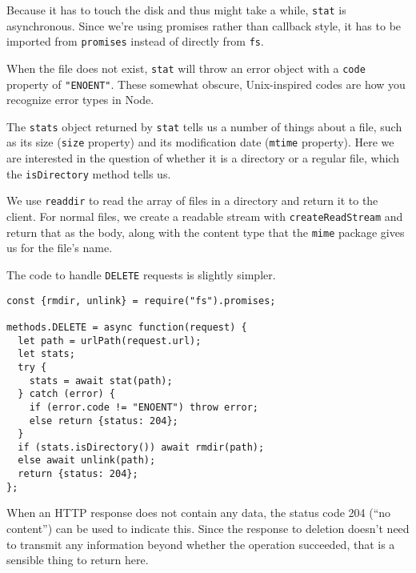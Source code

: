 Because it has to touch the disk and thus might take a while, \lstinline`stat` is asynchronous. Since we're using promises rather than callback style, it has to be imported from \lstinline`promises` instead of directly from \lstinline`fs`.

When the file does not exist, \lstinline`stat` will throw an error object with a \lstinline`code` property of \lstinline`"ENOENT"`. These somewhat obscure, Unix-inspired codes are how you recognize error types in Node.

The \lstinline`stats` object returned by \lstinline`stat` tells us a number of things about a file, such as its size (\lstinline`size` property) and its modification date (\lstinline`mtime` property). Here we are interested in the question of whether it is a directory or a regular file, which the \lstinline`isDirectory` method tells us.

We use \lstinline`readdir` to read the array of files in a directory and return it to the client. For normal files, we create a readable stream with \lstinline`createReadStream` and return that as the body, along with the content type that the \lstinline`mime` package gives us for the file's name.

The code to handle \lstinline`DELETE` requests is slightly simpler.

\begin{lstlisting}
const {rmdir, unlink} = require("fs").promises;

methods.DELETE = async function(request) {
  let path = urlPath(request.url);
  let stats;
  try {
    stats = await stat(path);
  } catch (error) {
    if (error.code != "ENOENT") throw error;
    else return {status: 204};
  }
  if (stats.isDirectory()) await rmdir(path);
  else await unlink(path);
  return {status: 204};
};
\end{lstlisting}
\noindent{}

When an HTTP response does not contain any data, the status code 204 (``no content'') can be used to indicate this. Since the response to deletion doesn't need to transmit any information beyond whether the operation succeeded, that is a sensible thing to return here.

